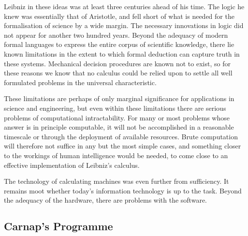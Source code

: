 Leibniz in these ideas was at least three centuries ahead of his time.
The logic he knew was essentially that of Aristotle, and fell short of what is needed for the formalisation of science by a wide margin.
The necessary innovations in logic did not appear for another two hundred years.
Beyond the adequacy of modern formal languages to express the entire corpus of scientific knowledge, there lie known limitations in the extent to which formal deduction can capture truth in these systems.
Mechanical decision procedures are known not to exist, so for these reasons we know that no calculus could be relied upon to settle all well formulated problems in the universal characteristic.

These limitations are perhaps of only marginal significance for applications in science and engineering, but even within these limitations there are serious problems of computational intractability.
For many or most problems whose answer is in principle computable, it will not be accomplished in a reasonable timescale or through the deployment of available resources.
Brute computation will therefore not suffice in any but the most simple cases, and something closer to the workings of human intelligence would be needed, to come close to an effective implementation of Leibniz's calculus.

The technology of calculating machines was even further from sufficiency.
It remains moot whether today's information technology is up to the task.
Beyond the adequacy of the hardware, there are problems with the software.

\subsection{Carnap's Programme}

